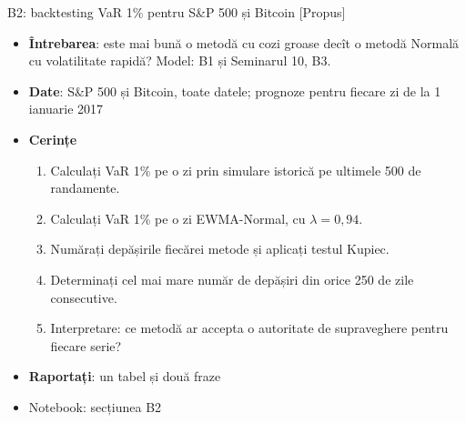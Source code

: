 \begin{frame}{B2: backtesting VaR 1\% pentru S\&P 500 și Bitcoin [Propus]}
\itemsize{\footnotesize}
\begin{itemize}
\item \textbf{Întrebarea}: este mai bună o metodă cu cozi groase decît o metodă Normală cu volatilitate rapidă? Model: B1 și Seminarul 10, B3.
\item \textbf{Date}: S\&P 500 și Bitcoin, toate datele; prognoze pentru fiecare zi de la 1 ianuarie 2017
\item \textbf{Cerințe}
\begin{enumerate}
    \item Calculați VaR 1\% pe o zi prin simulare istorică pe ultimele 500 de randamente.
    \item Calculați VaR 1\% pe o zi EWMA-Normal, cu $\lambda = 0{,}94$.
    \item Numărați depășirile fiecărei metode și aplicați testul Kupiec.
    \item Determinați cel mai mare număr de depășiri din orice 250 de zile consecutive.
    \item Interpretare: ce metodă ar accepta o autoritate de supraveghere pentru fiecare serie?
\end{enumerate}
\item \textbf{Raportați}: un tabel și două fraze
\item Notebook: secțiunea B2
\end{itemize}
\end{frame}

